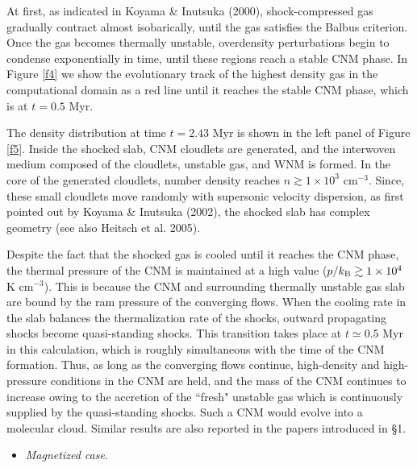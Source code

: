 \documentclass[12pt,preprint]{aastex}
\begin{document}
At first, as indicated in Koyama \& Inutsuka (2000), shock-compressed gas gradually contract almost isobarically, until the gas satisfies the Balbus criterion.
Once the gas becomes thermally unstable, overdensity perturbations begin to condense exponentially in time, until these regions reach a stable CNM phase.
In Figure \ref{f4} we show the evolutionary track of the highest density gas in the computational domain as a red line until it reaches the stable CNM phase, which is at $t=0.5$ Myr.

The density distribution at time $t=2.43$ Myr is shown in the left panel of Figure \ref{f5}.
Inside the shocked slab, CNM cloudlets are generated, and the interwoven medium composed of the cloudlets, unstable gas, and WNM is formed.
In the core of the generated cloudlets, number density reaches $n\gtrsim 1\times10^{3}$ cm$^{-3}$.
Since, these small cloudlets move randomly with supersonic velocity dispersion, as first pointed out by Koyama \& Inutsuka (2002), the shocked slab has complex geometry (see also Heitsch et al. 2005).

Despite the fact that the shocked gas is cooled until it reaches the CNM phase, the thermal pressure of the CNM is maintained at a high value ($p/k_{\rm B}\gtrsim 1\times10^{4}$ K cm$^{-3}$).
This is because the CNM and surrounding thermally unstable gas slab are bound by the ram pressure of the converging flows.
When the cooling rate in the slab balances the thermalization rate of the shocks, outward propagating shocks become quasi-standing shocks.
This transition takes place at $t\simeq 0.5$ Myr in this calculation, which is roughly simultaneous with the time of the CNM formation.
Thus, as long as the converging flows continue, high-density and high-pressure conditions in the CNM are held, and the mass of the CNM continues to increase owing to the accretion of the ``fresh" unstable gas which is continuously supplied by the quasi-standing shocks.
Such a CNM would evolve into a molecular cloud.
Similar results are also reported in the papers introduced in \S 1.

\begin{itemize}
\item \textit{Magnetized case}.
\end{itemize}
\end{document}
